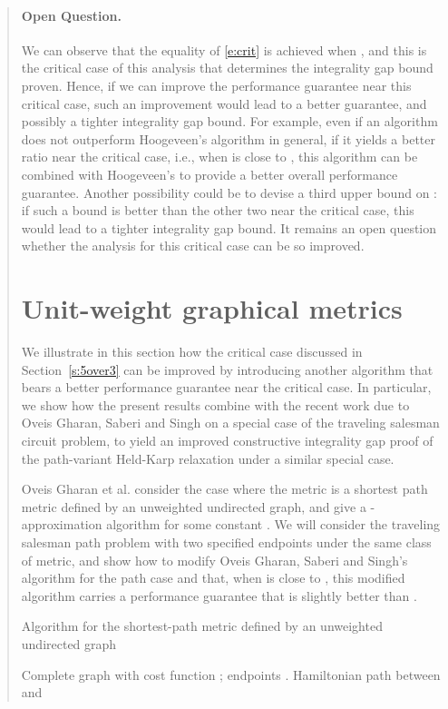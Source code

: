 \documentclass[11pt,letterpaper]{article}
\begin{document}
\begin{quote}
\paragraph{Open Question.} We can observe that the equality of \eqref{e:crit} is achieved when , and this is the critical case of this analysis that determines the integrality gap bound proven. Hence, if we can improve the performance guarantee near this critical case, such an improvement would lead to a better guarantee, and possibly a tighter integrality gap bound. For example, even if an algorithm does not outperform Hoogeveen's algorithm in general, if it yields a better ratio near the critical case, i.e., when  is close to , this algorithm can be combined with Hoogeveen's to provide a better overall performance guarantee. Another possibility could be to devise a third upper bound on : if such a bound is better than the other two near the critical case, this would lead to a tighter integrality gap bound. It remains an open question whether the analysis for this critical case can be so improved.

\section{Unit-weight graphical metrics}\label{s:gm}

We illustrate in this section how the critical case discussed in Section~\ref{s:5over3} can be improved by introducing another algorithm that bears a better performance guarantee near the critical case. In particular, we show how the present results combine with the recent work due to Oveis Gharan, Saberi and Singh \cite{OSS} on a special case of the traveling salesman circuit problem, to yield an improved constructive integrality gap proof of the path-variant Held-Karp relaxation under a similar special case.

Oveis Gharan et al. consider the case where the metric is a shortest path metric defined by an unweighted undirected graph, and give a -approximation algorithm for some constant . We will consider the traveling salesman path problem with two specified endpoints under the same class of metric, and show how to modify Oveis Gharan, Saberi and Singh's algorithm for the path case and that, when  is close to , this modified algorithm carries a performance guarantee that is slightly better than .

\begin{algorithm}[b!]
\caption{Algorithm for the shortest-path metric defined by an unweighted undirected graph}
\label{a:sc}
\begin{algorithmic}[1]
	\REQUIRE Complete graph  with cost function ; endpoints .
	\ENSURE Hamiltonian path between  and 


\end{algorithmic}
\end{algorithm}
\end{quote}
\end{document}
